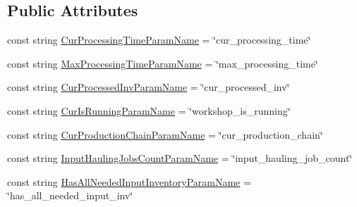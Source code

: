 \subsection*{Public Attributes}
\begin{DoxyCompactItemize}
\item 
const string \hyperlink{class_project_porcupine_1_1_buildable_1_1_components_1_1_workshop_1_1_work_shop_parameter_definitions_a54c9eed1619d27d784785a640733bed1}{Cur\+Processing\+Time\+Param\+Name} = \char`\"{}cur\+\_\+processing\+\_\+time\char`\"{}
\item 
const string \hyperlink{class_project_porcupine_1_1_buildable_1_1_components_1_1_workshop_1_1_work_shop_parameter_definitions_a9fb1ac0db43a53117c84f497cede24e1}{Max\+Processing\+Time\+Param\+Name} = \char`\"{}max\+\_\+processing\+\_\+time\char`\"{}
\item 
const string \hyperlink{class_project_porcupine_1_1_buildable_1_1_components_1_1_workshop_1_1_work_shop_parameter_definitions_aced20662ed558184deadeff77f117153}{Cur\+Processed\+Inv\+Param\+Name} = \char`\"{}cur\+\_\+processed\+\_\+inv\char`\"{}
\item 
const string \hyperlink{class_project_porcupine_1_1_buildable_1_1_components_1_1_workshop_1_1_work_shop_parameter_definitions_a585b78307f52a645fe3de4dbb215c597}{Cur\+Is\+Running\+Param\+Name} = \char`\"{}workshop\+\_\+is\+\_\+running\char`\"{}
\item 
const string \hyperlink{class_project_porcupine_1_1_buildable_1_1_components_1_1_workshop_1_1_work_shop_parameter_definitions_a66e14a2d18af0d53b2d7fa086fd97643}{Cur\+Production\+Chain\+Param\+Name} = \char`\"{}cur\+\_\+production\+\_\+chain\char`\"{}
\item 
const string \hyperlink{class_project_porcupine_1_1_buildable_1_1_components_1_1_workshop_1_1_work_shop_parameter_definitions_a8fac490345d1bd9c4ff2d4d06664d6bd}{Input\+Hauling\+Jobs\+Count\+Param\+Name} = \char`\"{}input\+\_\+hauling\+\_\+job\+\_\+count\char`\"{}
\item 
const string \hyperlink{class_project_porcupine_1_1_buildable_1_1_components_1_1_workshop_1_1_work_shop_parameter_definitions_aa09fbd42ef0c5d5e9fd17b96d80e4080}{Has\+All\+Needed\+Input\+Inventory\+Param\+Name} = \char`\"{}has\+\_\+all\+\_\+needed\+\_\+input\+\_\+inv\char`\"{}
\end{DoxyCompactItemize}
